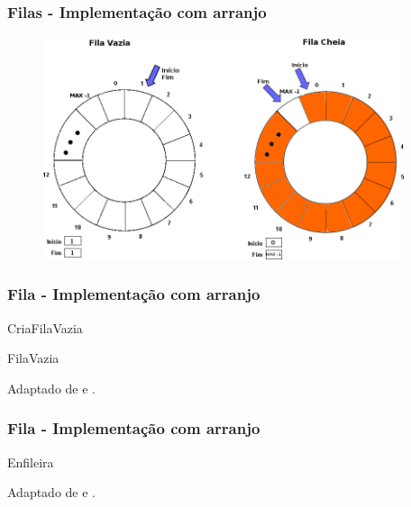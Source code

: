 \documentclass[aspectratio=169]{beamer}
\begin{document}
\begin{frame}
\frametitle{Filas - Implementação com arranjo}
\begin{figure}[!h]
  \includegraphics[width=300pt]{imgs/fila_estados.png}
\end{figure}
\end{frame}


\begin{frame}
\frametitle{Fila - Implementação com arranjo}
\begin{algorithm}[H]
\caption{CriaFilaVazia} 
\label{CriaFilaVazia}
\end{algorithm}
\begin{algorithm}[H]
\caption{FilaVazia} 
\label{FilaVazia}
\end{algorithm}
\tiny{ Adaptado de  e .}
\end{frame}


\begin{frame}
\frametitle{Fila - Implementação com arranjo}
\begin{algorithm}[H]
\caption{Enfileira} 
\label{Enfileira}
\end{algorithm}

\tiny{ Adaptado de  e .}
\end{frame}
\end{document}
